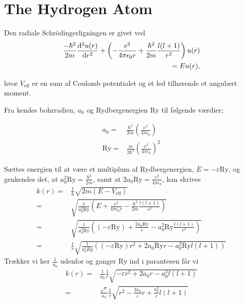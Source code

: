 \section{The Hydrogen Atom}
Den radiale Schrödingerligningen er givet ved \cite{griffiths}
%
\begin{align}
    \frac{-\hbar^{2}}{2m}\diff[2]{u(r)}{r} + \left( - \frac{e^{2}}{4\pi\epsilon_{0}r} + \frac{\hbar^{2}}{2m}\frac{l(l+1)}{r^{2}} \right)u(r) & \nonumber \\
    = Eu(r), &
    \label{eq:schroedinger3d}
\end{align}

hvor $V_{\text{eff}}$ er en sum af Coulomb potentialet og et led tilhørende et angulært moment.

Fra \cite{griffiths} kendes bohrradien, $a_{0}$ og Rydbergenergien $\mathrm{Ry}$ til følgende værdier;

\begin{align}
    a_{0} = & \frac{\hbar^{2}}{2m}\left( \frac{e^{2}}{4\pi\epsilon_{0}} \right) \\
\mathrm{Ry} = & \frac{m}{2\hbar^{2}}\left( \frac{e^{2}}{4\pi\epsilon_0} \right)^{2}
\label{eq:konstanter}
\end{align}

Sættes energien til at være et multiplum af Rydbergenergien, $E = -\varepsilon \mathrm{Ry}$, og genkendes det, at $a_{0}^{2}\mathrm{Ry} = \frac{\hbar^{2}}{2m}$, samt at $2a_{0}\mathrm{Ry} = \frac{e^{2}}{4\pi\epsilon_{0}}$, kan  skrives
\begin{align}
    k(r) = & \frac{1}{\hbar} \sqrt{2m\left( E - V_{\text{eff}} \right)}\\
    = & \sqrt{\frac{1}{a_{0}^{2}\mathrm{\mathrm{Ry}}} \left( E + \frac{e^{2}}{4\pi\epsilon_{0}r} - \frac{\hbar^{2}}{2m}\frac{l(l+1)}{r^{2}} \right)}\\
    = & \sqrt{\frac{1}{a_{0}^{2}\mathrm{Ry}} \left( (-\varepsilon \mathrm{Ry}) + \frac{2a_{0}\mathrm{Ry}}{r} - a_{0}^{2}\mathrm{Ry}\frac{l(l+1)}{r^{2}} \right)}\\
    = & \frac{1}{r} \sqrt{\frac{1}{a_{0}^{2}{Ry}} \left( (-\varepsilon \mathrm{Ry})r^{2} + 2a_{0}\mathrm{Ry} r - a_{0}^{2}\mathrm{Ry} l(l+1) \right)}
\end{align}
Trækker vi her $\frac{1}{a_0}$ udenfor og ganger $\mathrm{Ry}$ ind i parantesen får vi
\begin{align}
  k(r) = & \frac{1}{a_0} \frac{1}{r} \sqrt{-\varepsilon r^2 + 2a_0r - a_0^2l(l+1)} \\
  = & \frac{\sqrt{\varepsilon}}{a_0} \frac{1}{r} \sqrt{r^2 - \frac{2a_0}{\varepsilon}r + \frac{a_0^2}{\varepsilon}l(l+1)}
\end{align}

